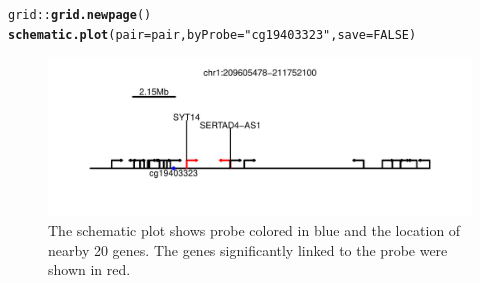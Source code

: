 \documentclass{article}\usepackage[]{graphicx}\usepackage[]{color}
\makeatletter
\def\maxwidth{ %
  \ifdim\Gin@nat@width>\linewidth
    \linewidth
  \else
    \Gin@nat@width
  \fi
}
\newcommand{\hlnum}[1]{\textcolor[rgb]{0.686,0.059,0.569}{#1}}%
\newcommand{\hlstr}[1]{\textcolor[rgb]{0.192,0.494,0.8}{#1}}%
\newcommand{\hlopt}[1]{\textcolor[rgb]{0,0,0}{#1}}%
\newcommand{\hlstd}[1]{\textcolor[rgb]{0.345,0.345,0.345}{#1}}%
\newcommand{\hlkwc}[1]{\textcolor[rgb]{0.333,0.667,0.333}{#1}}%
\newcommand{\hlkwd}[1]{\textcolor[rgb]{0.737,0.353,0.396}{\textbf{#1}}}%
\newenvironment{kframe}{%
 \def\at@end@of@kframe{}%
 \ifinner\ifhmode%
  \def\at@end@of@kframe{\end{minipage}}%
  \begin{minipage}{\columnwidth}%
 \fi\fi%
 \def\FrameCommand##1{\hskip\@totalleftmargin \hskip-\fboxsep
 \colorbox{shadecolor}{##1}\hskip-\fboxsep
     \hskip-\linewidth \hskip-\@totalleftmargin \hskip\columnwidth}%
 \MakeFramed {\advance\hsize-\width
   \@totalleftmargin\z@ \linewidth\hsize
   \@setminipage}}%
 {\par\unskip\endMakeFramed%
 \at@end@of@kframe}
\newenvironment{knitrout}{}{} %
\makeatother
\begin{document}
\begin{knitrout}
\color{fgcolor}\begin{kframe}
\begin{alltt}
\hlstd{grid}\hlopt{::}\hlkwd{grid.newpage}\hlstd{()}
\hlkwd{schematic.plot}\hlstd{(}\hlkwc{pair}\hlstd{=pair,} \hlkwc{byProbe}\hlstd{=}\hlstr{"cg19403323"}\hlstd{,} \hlkwc{save}\hlstd{=}\hlnum{FALSE}\hlstd{)}
\end{alltt}


{\ttfamily\noindent\itshape\color{messagecolor}{\#\# cg19403323}}\end{kframe}\begin{figure}
\includegraphics[width=\maxwidth]{figure/figure4-1} \caption[Nearby Genes]{\label{fig:cg19403323.schematic.byProbe} The schematic plot shows probe colored in blue and the location of nearby 20 genes. The genes significantly linked to the probe were shown in red.}\label{fig:figure4}
\end{figure}


\end{knitrout}
\end{document}
